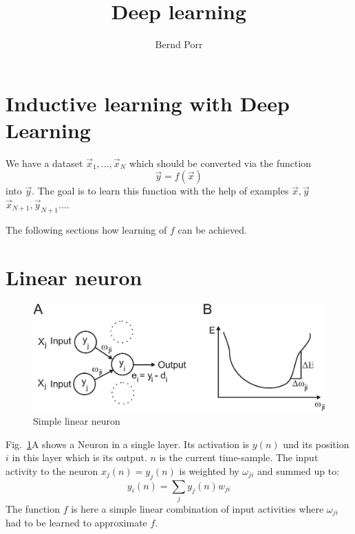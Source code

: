 \documentclass[12pt]{article}
\author{Bernd Porr}
\title{Deep learning}
\begin{document}
\maketitle

\section{Inductive learning with Deep Learning}
We have a dataset $\vec{x}_1, \ldots, \vec{x}_N$ which should be converted
via the function
\begin{equation}
  \vec{y}=f(\vec{x}) \label{inductive}
\end{equation}
into $\vec{y}$.  The goal is to learn this function with the help of
examples $\vec{x},\vec{y}$ $\vec{x}_{N+1},\vec{y}_{N+1} \ldots$.

The following sections how learning of $f$ can be achieved.

\section{Linear neuron}

\begin{figure}[!hbt]
\begin{center}
\mbox{\includegraphics[width=\textwidth]{one_layer}}
\end{center}
\caption{Simple linear neuron
\label{one_layer}}
\end{figure}

Fig.~\ref{one_layer}A shows a Neuron in a single layer.
Its activation is $y(n)$ und its position $i$ in this layer which is its output.
$n$ is the current time-sample. The input activity to the neuron $x_j(n) =
y_j(n)$ is weighted by $\omega_{ji}$ and summed up to:
\begin{equation}
  y_i(n) = \sum_j y_j(n) w_{ji} \label{linear_sum}
\end{equation}
The function $f$ is here a simple linear combination of input activities where
$\omega_{ji}$ had to be learned to approximate $f$.
\end{document}
